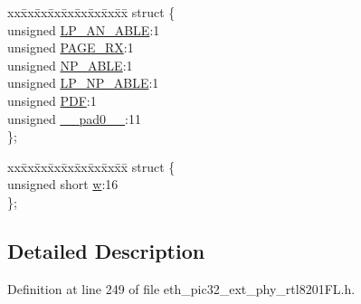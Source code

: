 \begin{DoxyCompactItemize}
\begin{tabbing}
\end{tabbing}\item 
\begin{tabbing}
xx\=xx\=xx\=xx\=xx\=xx\=xx\=xx\=xx\=\kill
struct \{\\
\>unsigned \hyperlink{union_____a_n_e_x_pbits__t_af491690ecb970d54e41753af685c88c4}{LP\_AN\_ABLE}:1\\
\>unsigned \hyperlink{union_____a_n_e_x_pbits__t_a3495443e84affeecbad3e1d2d8080a70}{PAGE\_RX}:1\\
\>unsigned \hyperlink{union_____a_n_e_x_pbits__t_a4502f03b3664f0c1b02bfbfdae50f349}{NP\_ABLE}:1\\
\>unsigned \hyperlink{union_____a_n_e_x_pbits__t_a70459ea04fc22f1abc90777a1da04b40}{LP\_NP\_ABLE}:1\\
\>unsigned \hyperlink{union_____a_n_e_x_pbits__t_a8c5bd7f969fa0ca92985a42453435c4f}{PDF}:1\\
\>unsigned \hyperlink{union_____a_n_e_x_pbits__t_adf71f3d8410c1f1dbbc96680a92c49af}{\_\_pad0\_\_}:11\\
\}; \\

\end{tabbing}\item 
\begin{tabbing}
xx\=xx\=xx\=xx\=xx\=xx\=xx\=xx\=xx\=\kill
struct \{\\
\>unsigned short \hyperlink{union_____a_n_e_x_pbits__t_a160850a4684a3e82c2323033964f2e98}{w}:16\\
\}; \\

\end{tabbing}\end{DoxyCompactItemize}


\subsection{Detailed Description}


Definition at line 249 of file eth\+\_\+pic32\+\_\+ext\+\_\+phy\+\_\+rtl8201\+F\+L.\+h.



